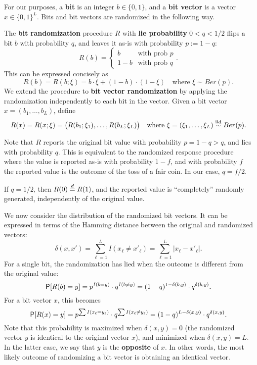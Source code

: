 \documentclass[11pt,draft]{article}
\begin{document}
For our purposes, a \textbf{bit} is an integer $b \in \{0,1\}$, and a \textbf{bit vector} is a vector $x \in \{0,1\}^L$.
Bits and bit vectors are randomized in the following way.

\begin{defn}
The \textbf{bit randomization} procedure $R$ with \textbf{lie probability} $0 < q < 1/2$ flips a bit $b$ with probability $q$, and leaves it as-is with probability $p := 1-q$:
\[ R(b) =
\begin{cases}
b & \text{with prob }p \\
1-b & \text{with prob }q
\end{cases}.
\]
This can be expressed concisely as
\[ R(b) = R(b; \xi) = b \cdot \xi + (1-b) \cdot (1-\xi)
\quad\text{where } \xi\sim Ber(p). \]
We extend the procedure to \textbf{bit vector randomization} by applying the randomization independently to each bit in the vector.
Given a bit vector $x = (b_1,\dots,b_L)$, define
\[ R(x) = R(x;\xi) = \big(R(b_1;\xi_1), \dots, R(b_L;\xi_L)\big)
\quad\text{where } \xi = (\xi_1,\dots,\xi_L) \iid Ber(p). \]
\end{defn}

\begin{rmk}
Note that $R$ reports the original bit value with probability $p = 1-q > q$, and lies with probability $q$.
This is equivalent to the randomized response procedure where the value is reported as-is with probability $1-f$, and with probability $f$ the reported value is the outcome of the toss of a fair coin.
In our case, $q = f/2$.
\end{rmk}
\begin{rmk}
If $q = 1/2$, then $R(0)\eqdist R(1)$, and the reported value is ``completely'' randomly generated, \ie independently of the original value.
\end{rmk}


We now consider the distribution of the randomized bit vectors.
It can be expressed in terms of the Hamming distance between the original and randomized vectors:
\[ \delta(x,x') = \sum_{\ell = 1}^L I(x_\ell \neq x'_\ell)
= \sum_{\ell = 1}^L |x_\ell - x'_\ell|. \]
For a single bit, the randomization has lied when the outcome is different from the original value: 
\[ \P[R(b) = y] = p^{I(b = y)}\cdot q^{I(b \neq y)}
= (1-q)^{1 - \delta(b,y)}\cdot q^{\delta(b,y)}. \]
For a bit vector $x$, this becomes
\[ \P[R(x) = y] = p^{\sum I(x_\ell = y_\ell)}\cdot q^{\sum I(x_\ell \neq y_\ell)}
= (1-q)^{L-\delta(x,y)}\cdot q^{\delta(x,y)}.
\]
Note that this probability is maximized when $\delta(x,y) = 0$ (the randomized vector $y$ is identical to the original vector $x$), and minimized when $\delta(x,y) = L$.
In the latter case, we say that $y$ is the \textbf{opposite} of $x$.
In other words, the most likely outcome of randomizing a bit vector is obtaining an identical vector.
\end{document}
